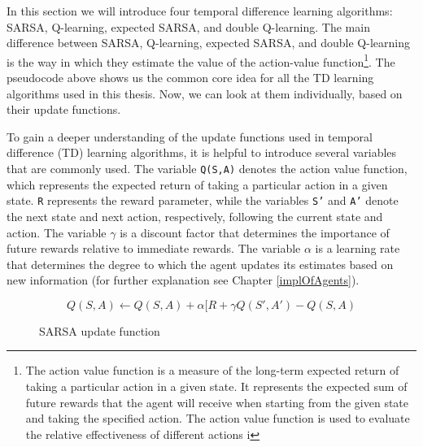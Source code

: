 In this section we will introduce four temporal difference learning algorithms: SARSA, Q-learning, expected SARSA, and double Q-learning.  The main difference between SARSA, Q-learning, expected SARSA, and double Q-learning is the way in which they estimate the value of the action-value function\footnote{The action value function is a measure of the long-term expected return of taking a particular action in a given state. It represents the expected sum of future rewards that the agent will receive when starting from the given state and taking the specified action. The action value function is used to evaluate the relative effectiveness of different actions i}. The pseudocode above shows us the common core idea for all the TD learning algorithms used in this thesis. Now, we can look at them individually, based on their update functions.

To gain a deeper understanding of the update functions used in temporal difference (TD) learning algorithms, it is helpful to introduce several variables that are commonly used. The variable \texttt{Q(S,A)} denotes the action value function, which represents the expected return of taking a particular action in a given state. \texttt{R} represents the reward parameter, while the variables \texttt{S'} and \texttt{A'} denote the next state and next action, respectively, following the current state and action. The variable $\gamma$ is a discount factor that determines the importance of future rewards relative to immediate rewards. The variable $\alpha$ is a learning rate that determines the degree to which the agent updates its estimates based on new information (for further explanation see Chapter \ref{implOfAgents}).

\begin{figure}[h]
    \centering
   $$Q(S,A) \leftarrow Q(S,A) + \alpha [R + \gamma Q(S',A') - Q(S,A)$$
    \caption{SARSA update function}
    \label{algo:S}
\end{figure}


